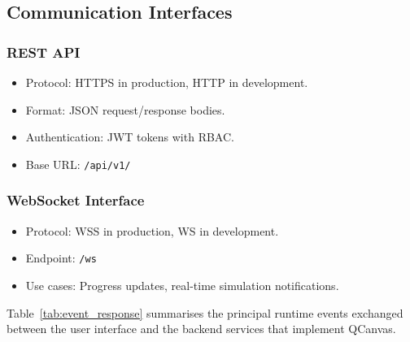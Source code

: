 \subsection{Communication Interfaces}

\subsubsection{REST API}
\begin{itemize}
    \item Protocol: HTTPS in production, HTTP in development.
    \item Format: JSON request/response bodies.
    \item Authentication: JWT tokens with RBAC.
    \item Base URL: \texttt{/api/v1/}
\end{itemize}

\subsubsection{WebSocket Interface}
\begin{itemize}
    \item Protocol: WSS in production, WS in development.
    \item Endpoint: \texttt{/ws}
    \item Use cases: Progress updates, real-time simulation notifications.
\end{itemize}

Table~\ref{tab:event_response} summarises the principal runtime events exchanged between the user interface and the backend services that implement QCanvas.

